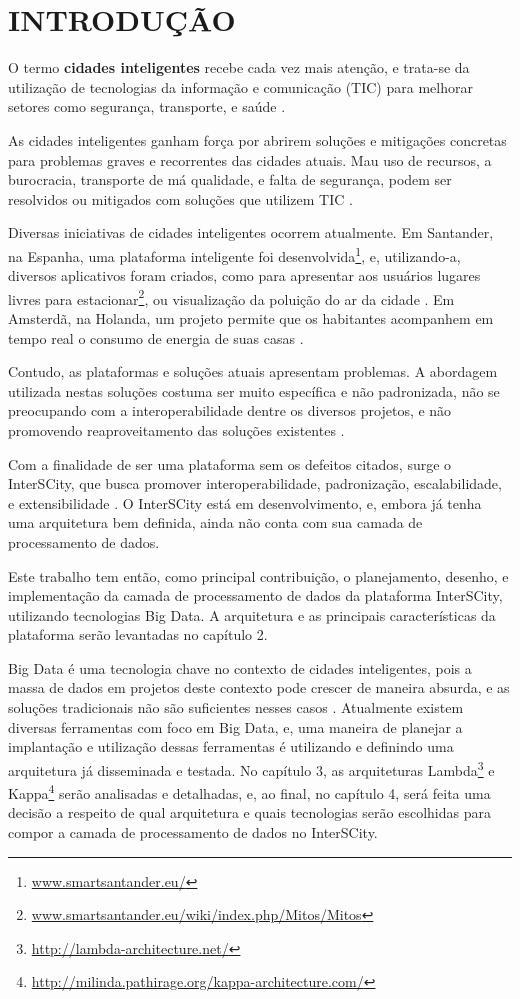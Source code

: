 \chapter[INTRODUÇÃO]{INTRODUÇÃO}

O termo \textbf{cidades inteligentes} recebe cada vez mais atenção, e trata-se
da utilização de tecnologias da informação e comunicação (TIC) para melhorar
setores como segurança, transporte, e saúde \cite{batty2012smart}.

As cidades inteligentes ganham força por abrirem soluções e mitigações
concretas para problemas graves e recorrentes das cidades atuais. Mau uso de
recursos, a burocracia, transporte de má qualidade, e falta de segurança,
podem ser resolvidos ou mitigados com soluções que utilizem
TIC \cite{batty2012smart}.

Diversas iniciativas de cidades inteligentes ocorrem atualmente. Em Santander,
na Espanha, uma plataforma inteligente foi
desenvolvida\footnote{\url{www.smartsantander.eu/}}, e, utilizando-a,
diversos aplicativos foram criados, como para apresentar aos usuários lugares
livres para estacionar\footnote{\url{www.smartsantander.eu/wiki/index.php/Mitos/Mitos}}, ou visualização
da poluição do ar da cidade \cite{santana2016software}. Em Amsterdã, na Holanda,
um projeto permite que os habitantes acompanhem em tempo real o consumo de
energia de suas casas \cite{kon2016}.

Contudo, as plataformas e soluções atuais apresentam problemas. A abordagem
utilizada nestas soluções costuma ser muito específica e não padronizada, não
se preocupando com a interoperabilidade dentre os diversos projetos, e não
promovendo reaproveitamento das soluções existentes \cite{delesposte2017}.

Com a finalidade de ser uma plataforma sem os defeitos citados, surge o
InterSCity, que busca promover interoperabilidade, padronização,
escalabilidade, e extensibilidade \cite{delesposte2017}. O InterSCity está em
desenvolvimento, e, embora já tenha uma arquitetura bem definida, ainda não
conta com sua camada de processamento de dados.

Este trabalho tem então, como principal contribuição, o planejamento, desenho,
e implementação da camada de processamento de dados da plataforma InterSCity,
utilizando tecnologias Big Data. A arquitetura e as principais características
da plataforma serão levantadas no capítulo 2.

Big Data é uma tecnologia chave no contexto de cidades inteligentes, pois a
massa de dados em projetos deste contexto pode crescer de maneira absurda, e as
soluções tradicionais não são suficientes nesses casos \cite{batty2012smart}.
Atualmente existem diversas ferramentas com foco em Big Data, e, uma maneira de
planejar a implantação e utilização dessas ferramentas é utilizando e definindo
uma arquitetura já disseminada e testada. No capítulo 3, as arquiteturas
Lambda\footnote{\url{http://lambda-architecture.net/}} e
Kappa\footnote{\url{http://milinda.pathirage.org/kappa-architecture.com/}}
serão analisadas e detalhadas, e, ao final, no capítulo 4, será feita uma
decisão a respeito de qual arquitetura e quais tecnologias serão escolhidas
para compor a camada de processamento de dados no InterSCity.
